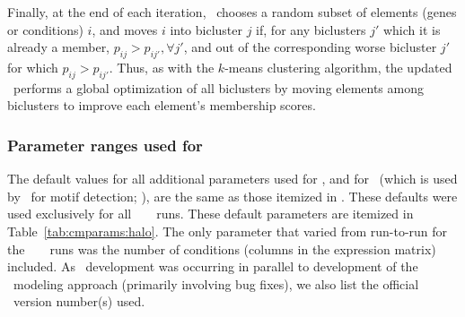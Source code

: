 Finally, at the end of each iteration, \cm\ chooses a random subset of
elements (genes or conditions) $i$, and moves $i$ into bicluster $j$
if, for any biclusters $j'$ which it is already a member, $p_{ij} >
p_{ij'}, \forall j'$, and out of the corresponding worse bicluster
$j'$ for which $p_{ij} > p_{ij'}$. Thus, as with the $k$-means
clustering algorithm, the updated \cm\ performs a global optimization
of all biclusters by moving elements among biclusters to improve each
element's membership scores.

\subsubsection{Parameter ranges used for \egrine}

The default values for all additional parameters used for \cm, and for
\MEME\ (which is used by \cm\ for motif detection; \cite{Bailey1998}),
are the same as those itemized in \cite{Reiss2006n}. These defaults
were used exclusively for all \halo~ \cm~ runs. These default
parameters are itemized in Table~\ref{tab:cmparams:halo}. The only
parameter that varied from run-to-run for the \halo~ \cm~ runs was the
number of conditions (columns in the expression matrix) included. As
\cm~development was occurring in parallel to development of the
\egrine~modeling approach (primarily involving bug fixes), we also
list the official \cm~version number(s) used.

